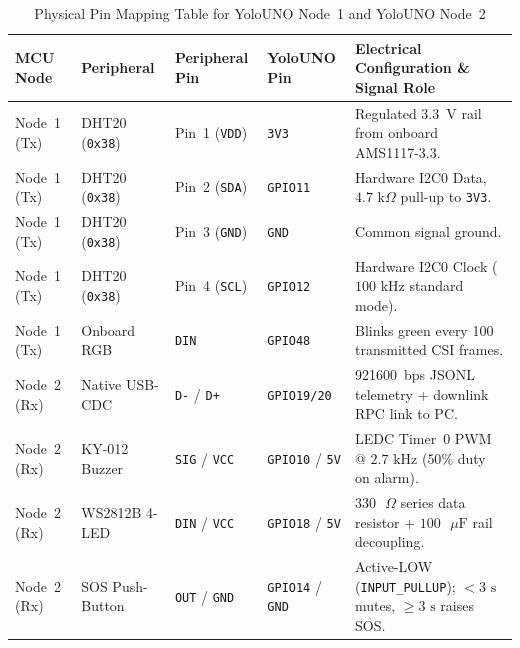 \documentclass{hcmut-report}
\begin{document}
\begin{table}[H]
\centering
\caption{Physical Pin Mapping Table for YoloUNO Node~1 and YoloUNO Node~2}
\label{tab:pinout}
\footnotesize
\begin{tabularx}{\textwidth}{|P{2.2cm}|P{2.7cm}|P{2.4cm}|P{2.2cm}|Y|}
\hline
\textbf{MCU Node} & \textbf{Peripheral} & \textbf{Peripheral Pin} & \textbf{YoloUNO Pin} & \textbf{Electrical Configuration \& Signal Role} \\
\hline
Node~1 (Tx) & DHT20 (\texttt{0x38}) & Pin~1 (\texttt{VDD}) & \texttt{3V3} & Regulated 3.3~V rail from onboard AMS1117-3.3. \\
\hline
Node~1 (Tx) & DHT20 (\texttt{0x38}) & Pin~2 (\texttt{SDA}) & \texttt{GPIO11} & Hardware I2C0 Data, $4.7\text{ k}\Omega$ pull-up to \texttt{3V3}. \\
\hline
Node~1 (Tx) & DHT20 (\texttt{0x38}) & Pin~3 (\texttt{GND}) & \texttt{GND} & Common signal ground. \\
\hline
Node~1 (Tx) & DHT20 (\texttt{0x38}) & Pin~4 (\texttt{SCL}) & \texttt{GPIO12} & Hardware I2C0 Clock ($100\text{ kHz}$ standard mode). \\
\hline
Node~1 (Tx) & Onboard RGB & \texttt{DIN} & \texttt{GPIO48} & Blinks green every 100 transmitted CSI frames. \\
\hline
Node~2 (Rx) & Native USB-CDC & \texttt{D-} / \texttt{D+} & \texttt{GPIO19/20} & 921600~bps JSONL telemetry + downlink RPC link to PC. \\
\hline
Node~2 (Rx) & KY-012 Buzzer & \texttt{SIG} / \texttt{VCC} & \texttt{GPIO10} / \texttt{5V} & LEDC Timer~0 PWM @ $2.7\text{ kHz}$ ($50\%$ duty on alarm). \\
\hline
Node~2 (Rx) & WS2812B 4-LED & \texttt{DIN} / \texttt{VCC} & \texttt{GPIO18} / \texttt{5V} & $330\text{ }\Omega$ series data resistor + $100\text{ }\mu\text{F}$ rail decoupling. \\
\hline
Node~2 (Rx) & SOS Push-Button & \texttt{OUT} / \texttt{GND} & \texttt{GPIO14} / \texttt{GND} & Active-LOW (\texttt{INPUT\_PULLUP}); $<3\text{ s}$ mutes, $\ge 3\text{ s}$ raises SOS. \\
\hline
\end{tabularx}
\end{table}
\end{document}
